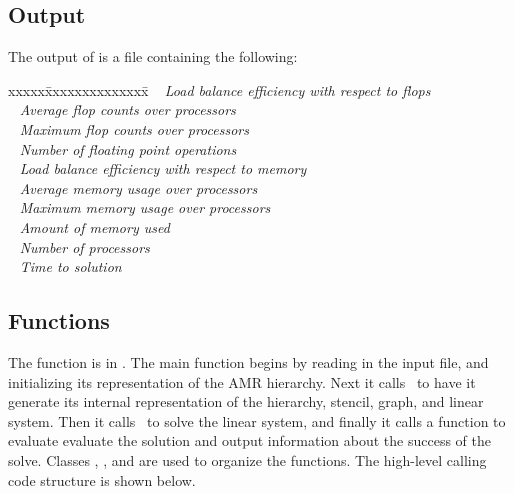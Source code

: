 \documentclass[10pt]{article}
\begin{document}
\subsection{Output}

The output of  is a file containing the following:

\begin{tabbing}
xxxxx\=xxxxxxxxxxxxxx\=\kill
\> \todo\  \>    \textit{Load balance efficiency with respect to flops}\\
\> \todo\  \> \textit{Average flop counts over processors} \\
\> \todo\  \> \textit{Maximum flop counts over processors} \\
\> \todo\  \> \textit{Number of floating point operations} \\
\> \todo\  \>    \textit{Load balance efficiency with respect to memory}\\
\> \todo\  \> \textit{Average memory usage over processors} \\
\> \todo\  \>    \textit{Maximum memory usage over processors} \\
\> \todo\  \> \textit{Amount of memory used} \\
\> \todo\  \> \textit{Number of processors} \\
\> \todo\  \>  \textit{Time to solution}
\end{tabbing}



\subsection{Functions} \label{ss:design}

The  function is in .  The main
function begins by reading in the input file, and initializing its
representation of the AMR hierarchy.  Next it calls \hypre\
to have it generate its internal representation of 
the hierarchy, stencil, graph, and linear system.  Then it
calls \hypre\ to solve the linear system, and finally it calls
a function to evaluate evaluate the solution and output 
information about the success of the solve.  Classes ,
\code{hierarchy}, and \code{hypre} are used to organize the functions.
The high-level  calling code structure is shown below.
\end{document}
